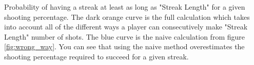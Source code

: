 \textbf{\label{fig:right_way}} Probability of having a streak at least as long as "Streak Length" for a given shooting percentage.  The dark orange curve is the full calculation which takes into account all of the different ways a player can consecutively make "Streak Length" number of shots.  The blue curve is the naive calculation from figure \ref{fig:wrong_way}.  You can see that using the naive method overestimates the shooting percentage required to succeed for a given streak.